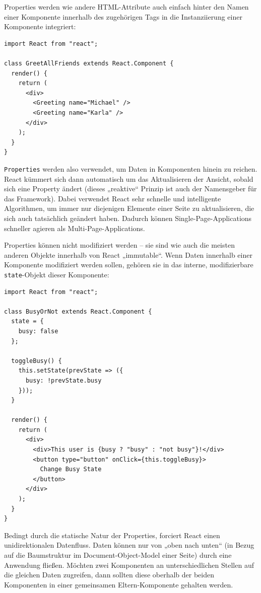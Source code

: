 Properties werden wie andere HTML-Attribute auch einfach hinter den Namen einer Komponente innerhalb des zugehörigen Tags in die Instanziierung einer Komponente integriert:

\begin{minipage}{\linewidth}
\begin{lstlisting}[caption={Properties werden wie normale HTML-Attribute verwendet.}]
import React from "react";

class GreetAllFriends extends React.Component {
  render() {
    return (
      <div>
        <Greeting name="Michael" />
        <Greeting name="Karla" />
      </div>
    );
  }
}
\end{lstlisting}
\end{minipage}

\texttt{Properties} werden also verwendet, um Daten in Komponenten hinein zu reichen. React kümmert sich dann automatisch um das Aktualisieren der Ansicht, sobald sich eine Property ändert (dieses „reaktive“ Prinzip ist auch der Namensgeber für das Framework). Dabei verwendet React sehr schnelle und intelligente Algorithmen, um immer nur diejenigen Elemente einer Seite zu aktualisieren, die sich auch tatsächlich geändert haben. Dadurch können Single-Page-Applications schneller agieren als Multi-Page-Applications.

Properties können nicht modifiziert werden – sie sind wie auch die meisten anderen Objekte innerhalb von React „immutable“. Wenn Daten innerhalb einer Komponente modifiziert werden sollen, gehören sie in das interne, modifizierbare \texttt{state}-Objekt dieser Komponente:

\begin{minipage}{\linewidth}
\begin{lstlisting}[caption={Jede Komponente kann über einen modifizierbaren state verfügen.}]
import React from "react";

class BusyOrNot extends React.Component {
  state = {
    busy: false
  };

  toggleBusy() {
    this.setState(prevState => ({
      busy: !prevState.busy
    }));
  }

  render() {
    return (
      <div>
        <div>This user is {busy ? "busy" : "not busy"}!</div>
        <button type="button" onClick={this.toggleBusy}>
          Change Busy State
        </button>
      </div>
    );
  }
}
\end{lstlisting}
\end{minipage}

Bedingt durch die statische Natur der Properties, forciert React einen unidirektionalen Datenfluss. Daten können nur von „oben nach unten“ (in Bezug auf die Baumstruktur im Document-Object-Model einer Seite) durch eine Anwendung fließen. Möchten zwei Komponenten an unterschiedlichen Stellen auf die gleichen Daten zugreifen, dann sollten diese oberhalb der beiden Komponenten in einer gemeinsamen Eltern-Komponente gehalten werden.\newline

